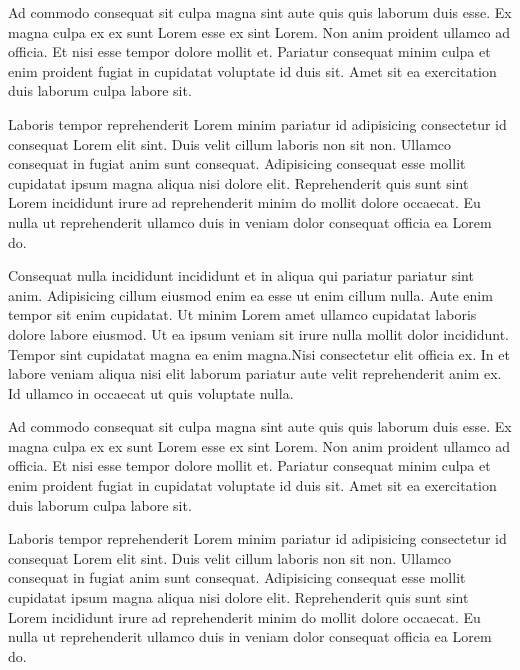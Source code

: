 Ad commodo consequat sit culpa magna sint aute quis quis laborum duis esse. Ex magna culpa ex ex sunt Lorem esse ex sint Lorem. Non anim proident ullamco ad officia. Et nisi esse tempor dolore mollit et. Pariatur consequat minim culpa et enim proident fugiat in cupidatat voluptate id duis sit. Amet sit ea exercitation duis laborum culpa labore sit.

Laboris tempor reprehenderit Lorem minim pariatur id adipisicing consectetur id consequat Lorem elit sint. Duis velit cillum laboris non sit non. Ullamco consequat in fugiat anim sunt consequat. Adipisicing consequat esse mollit cupidatat ipsum magna aliqua nisi dolore elit. Reprehenderit quis sunt sint Lorem incididunt irure ad reprehenderit minim do mollit dolore occaecat. Eu nulla ut reprehenderit ullamco duis in veniam dolor consequat officia ea Lorem do.

Consequat nulla incididunt incididunt et in aliqua qui pariatur pariatur sint anim. Adipisicing cillum eiusmod enim ea esse ut enim cillum nulla. Aute enim tempor sit enim cupidatat. Ut minim Lorem amet ullamco cupidatat laboris dolore labore eiusmod. Ut ea ipsum veniam sit irure nulla mollit dolor incididunt. Tempor sint cupidatat magna ea enim magna.Nisi consectetur elit officia ex. In et labore veniam aliqua nisi elit laborum pariatur aute velit reprehenderit anim ex. Id ullamco in occaecat ut quis voluptate nulla.

Ad commodo consequat sit culpa magna sint aute quis quis laborum duis esse. Ex magna culpa ex ex sunt Lorem esse ex sint Lorem. Non anim proident ullamco ad officia. Et nisi esse tempor dolore mollit et. Pariatur consequat minim culpa et enim proident fugiat in cupidatat voluptate id duis sit. Amet sit ea exercitation duis laborum culpa labore sit.

Laboris tempor reprehenderit Lorem minim pariatur id adipisicing consectetur id consequat Lorem elit sint. Duis velit cillum laboris non sit non. Ullamco consequat in fugiat anim sunt consequat. Adipisicing consequat esse mollit cupidatat ipsum magna aliqua nisi dolore elit. Reprehenderit quis sunt sint Lorem incididunt irure ad reprehenderit minim do mollit dolore occaecat. Eu nulla ut reprehenderit ullamco duis in veniam dolor consequat officia ea Lorem do.

